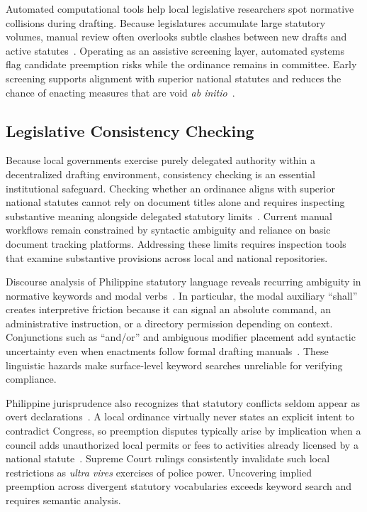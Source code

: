     Automated computational tools help local legislative researchers spot normative collisions during drafting. Because legislatures accumulate large statutory volumes, manual review often overlooks subtle clashes between new drafts and active statutes~\cite{ruhl2015measuring}. Operating as an assistive screening layer, automated systems flag candidate preemption risks while the ordinance remains in committee. Early screening supports alignment with superior national statutes and reduces the chance of enacting measures that are void \textit{ab initio}~\cite{scp1994magtajasvpryce}.

    \subsection{Legislative Consistency Checking}
    Because local governments exercise purely delegated authority within a decentralized drafting environment, consistency checking is an essential institutional safeguard. Checking whether an ordinance aligns with superior national statutes cannot rely on document titles alone and requires inspecting substantive meaning alongside delegated statutory limits~\cite{agpalo2009statutory, italiani2026clash, scp1994magtajasvpryce}. Current manual workflows remain constrained by syntactic ambiguity and reliance on basic document tracking platforms. Addressing these limits requires inspection tools that examine substantive provisions across local and national repositories.

    Discourse analysis of Philippine statutory language reveals recurring ambiguity in normative keywords and modal verbs~\cite{scp1970villacortavbernardo}. In particular, the modal auxiliary ``shall'' creates interpretive friction because it can signal an absolute command, an administrative instruction, or a directory permission depending on context. Conjunctions such as ``and/or'' and ambiguous modifier placement add syntactic uncertainty even when enactments follow formal drafting manuals~\cite{bernardo2023disambiguating}. These linguistic hazards make surface-level keyword searches unreliable for verifying compliance.

    Philippine jurisprudence also recognizes that statutory conflicts seldom appear as overt declarations~\cite{cruz2007political}. A local ordinance virtually never states an explicit intent to contradict Congress, so preemption disputes typically arise by implication when a council adds unauthorized local permits or fees to activities already licensed by a national statute~\cite{scp1970villacortavbernardo}. Supreme Court rulings consistently invalidate such local restrictions as \textit{ultra vires} exercises of police power. Uncovering implied preemption across divergent statutory vocabularies exceeds keyword search and requires semantic analysis.

